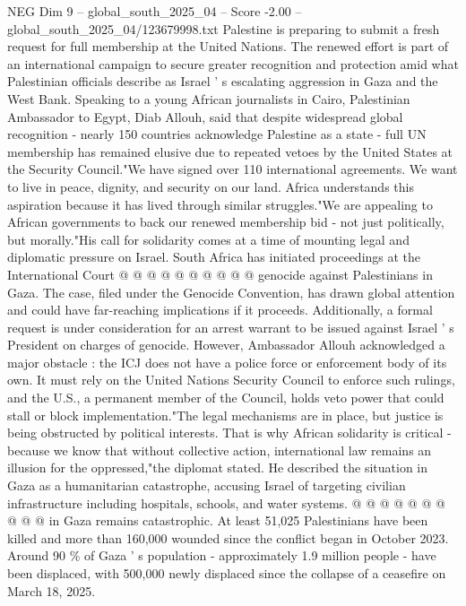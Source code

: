 \begin{textsample}{NEG Dim 9 – global\_south\_2025\_04 – Score -2.00 – global\_south\_2025\_04/123679998.txt}  \label{ex:f9_neg_275}
Palestine is preparing to submit a fresh request for full membership at the United Nations.
The renewed effort is part of an international campaign to secure greater recognition and protection amid what Palestinian officials describe as Israel ' s escalating aggression in Gaza and the West Bank.
Speaking to a young African journalists in Cairo, Palestinian Ambassador to Egypt, Diab Allouh, said that despite widespread global recognition - nearly 150 countries acknowledge Palestine as a state - full UN membership has remained elusive due to repeated vetoes by the United States at the Security Council."We have signed over 110 international agreements.
We want to live in peace, dignity, and security on our land.
Africa understands this aspiration because it has lived through similar struggles."We are appealing to African governments to back our renewed membership bid - not just politically, but morally."His call for solidarity comes at a time of mounting legal and diplomatic pressure on Israel.
South Africa has initiated proceedings at the International Court @ @ @ @ @ @ @ @ @ @ genocide against Palestinians in Gaza.
The case, filed under the Genocide Convention, has drawn global attention and could have far-reaching implications if it proceeds.
Additionally, a formal request is under consideration for an arrest warrant to be issued against Israel ' s President on charges of genocide.
However, Ambassador Allouh acknowledged a major obstacle : the ICJ does not have a police force or enforcement body of its own.
It must rely on the United Nations Security Council to enforce such rulings, and the U.S., a permanent member of the Council, holds veto power that could stall or block implementation."The legal mechanisms are in place, but justice is being obstructed by political interests.
That is why African solidarity is critical - because we know that without collective action, international law remains an illusion for the oppressed,"the diplomat stated.
He described the situation in Gaza as a humanitarian catastrophe, accusing Israel of targeting civilian infrastructure including hospitals, schools, and water systems. @ @ @ @ @ @ @ @ @ @ in Gaza remains catastrophic.
At least 51,025 Palestinians have been killed and more than 160,000 wounded since the conflict began in October 2023.
Around 90 \% of Gaza ' s population - approximately 1.9 million people - have been displaced, with 500,000 newly displaced since the collapse of a ceasefire on March 18, 2025.

\end{textsample}
